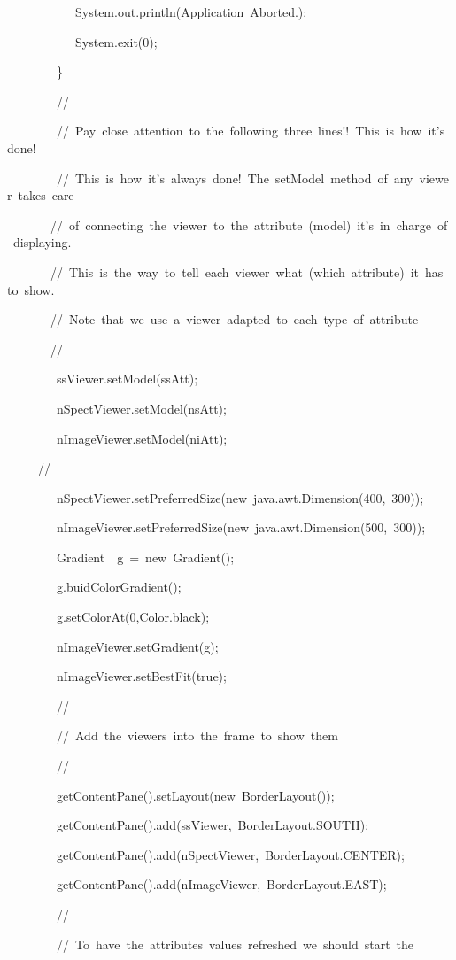 \begin{lyxcode}
~~~~~~~~~~~System.out.println(\textquotedbl{}Application~Aborted.\textquotedbl{});

~~~~~~~~~~~System.exit(0);

~~~~~~~~\}~~~~~~~~

~~~~~~~~//

~~~~~~~~//~Pay~close~attention~to~the~following~three~lines!!~This~is~how~it's~done!

~~~~~~~~//~This~is~how~it's~always~done!~The~setModel~method~of~any~viewer~takes~care

~~~~~~~//~of~connecting~the~viewer~to~the~attribute~(model)~it's~in~charge~of~displaying.

~~~~~~~//~This~is~the~way~to~tell~each~viewer~what~(which~attribute)~it~has~to~show.

~~~~~~~//~Note~that~we~use~a~viewer~adapted~to~each~type~of~attribute

~~~~~~~//

~~~~~~~~ssViewer.setModel(ssAtt);

~~~~~~~~nSpectViewer.setModel(nsAtt);

~~~~~~~~nImageViewer.setModel(niAtt);

~~~~~//

~~~~~~~~nSpectViewer.setPreferredSize(new~java.awt.Dimension(400,~300));

~~~~~~~~nImageViewer.setPreferredSize(new~java.awt.Dimension(500,~300));

~~~~~~~~Gradient~~g~=~new~Gradient();

~~~~~~~~g.buidColorGradient();

~~~~~~~~g.setColorAt(0,Color.black);

~~~~~~~~nImageViewer.setGradient(g);

~~~~~~~~nImageViewer.setBestFit(true);



~~~~~~~~//

~~~~~~~~//~Add~the~viewers~into~the~frame~to~show~them

~~~~~~~~//

~~~~~~~~getContentPane().setLayout(new~BorderLayout());

~~~~~~~~getContentPane().add(ssViewer,~BorderLayout.SOUTH);

~~~~~~~~getContentPane().add(nSpectViewer,~BorderLayout.CENTER);

~~~~~~~~getContentPane().add(nImageViewer,~BorderLayout.EAST);

~~~~~~~~//

~~~~~~~~//~To~have~the~attributes~values~refreshed~we~should~start~the


\end{lyxcode}

